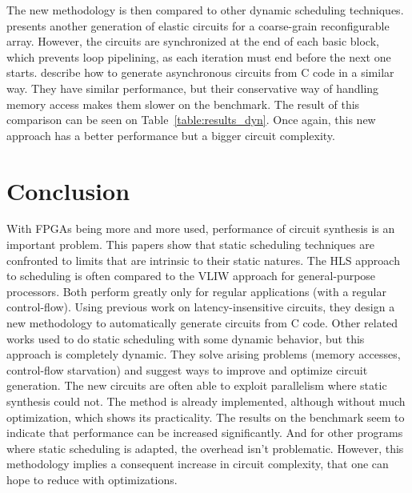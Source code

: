 \documentclass{article}
\begin{document}
The new methodology is then compared to other dynamic scheduling techniques.
\cite{DBLP:conf/fpga/HuangITCW13} presents another generation of elastic circuits for a coarse-grain reconfigurable array. However, the circuits are synchronized at the end of each basic block, which prevents loop pipelining, as each iteration must end before the next one starts.
\cite{DBLP:conf/ispass/BudiuAG05, budiu-tr02} describe how to generate asynchronous circuits from C code in a similar way. They have similar performance, but their conservative way of handling memory access makes them slower on the benchmark.
The result of this comparison can be seen on Table~\ref{table:results_dyn}. Once again, this new approach has a better performance but a bigger circuit complexity.

\section{Conclusion}
With FPGAs being more and more used, performance of circuit synthesis is an important problem.
This papers show that static scheduling techniques are confronted to limits that are intrinsic to their static natures.
The HLS approach to scheduling is often compared to the VLIW approach for general-purpose processors. Both perform greatly only for regular applications (with a regular control-flow).
Using previous work on latency-insensitive circuits, they design a new methodology to automatically generate circuits from C code.
Other related works used to do static scheduling with some dynamic behavior, but this approach is completely dynamic.
They solve arising problems (memory accesses, control-flow starvation) and suggest ways to improve and optimize circuit generation.
The new circuits are often able to exploit parallelism where static synthesis could not.
The method is already implemented, although without much optimization, which shows its practicality.
The results on the benchmark seem to indicate that performance can be increased significantly. And for other programs where static scheduling is adapted, the overhead isn't problematic.
However, this methodology implies a consequent increase in circuit complexity, that one can hope to reduce with optimizations.
\end{document}

